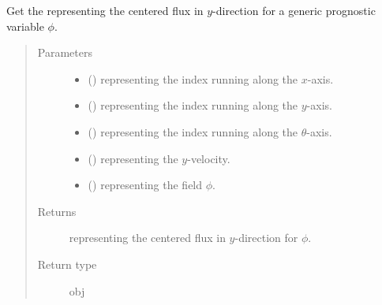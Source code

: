 \documentclass[letterpaper,10pt,english]{sphinxmanual}
\begin{document}
\begin{fulllineitems}
\begin{fulllineitems}
\label{\detokenize{api:dycore.flux_isentropic_centered.FluxIsentropicCentered._get_centered_flux_y}}
Get the  representing the centered flux in \(y\)-direction for a generic
prognostic variable \(\phi\).
\begin{quote}\begin{description}
\item[{Parameters}] \leavevmode\begin{itemize}
\item {} 
 () \textendash{}  representing the index running along the \(x\)-axis.

\item {} 
 () \textendash{}  representing the index running along the \(y\)-axis.

\item {} 
 () \textendash{}  representing the index running along the \(\theta\)-axis.

\item {} 
 () \textendash{}  representing the \(y\)-velocity.

\item {} 
 () \textendash{}  representing the field \(\phi\).

\end{itemize}

\item[{Returns}] \leavevmode
{} representing the centered flux in \(y\)-direction for \(\phi\).

\item[{Return type}] \leavevmode
obj

\end{description}\end{quote}

\end{fulllineitems}



\end{fulllineitems}
\end{document}
